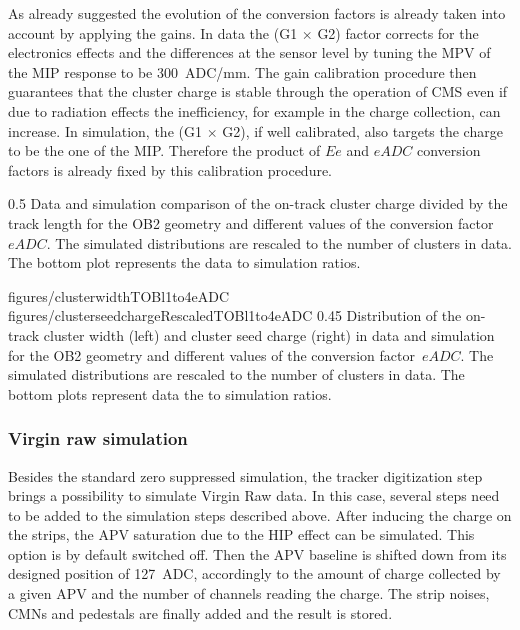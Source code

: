 As already suggested the evolution of the conversion factors is already taken into account by applying the gains. In data the (G1 $\times$ G2) factor corrects for the electronics effects and the differences at the sensor level by tuning the MPV of the MIP response to be 300~ADC/mm. The gain calibration procedure then guarantees that the cluster charge is stable through the operation of CMS even if due to radiation effects the inefficiency, for example in the charge collection, can increase. In simulation, the (G1 $\times$ G2), if well calibrated, also targets the charge to be the one of the MIP. Therefore the product of $Ee$ and $eADC$ conversion factors is already fixed by this calibration procedure. 


                 {0.5}       %
                 { Data and simulation comparison of the on-track cluster charge divided by the track length for the OB2 geometry and different values of the conversion factor~$eADC$. The simulated distributions are rescaled to the number of clusters in data.  The bottom plot represents the data to simulation ratios. }

                 {figures/clusterwidthTOBl1to4eADC}
                 {figures/clusterseedchargeRescaledTOBl1to4eADC} %
                 {0.45}       %
                 { Distribution of the on-track cluster width (left) and cluster seed charge (right) in data and simulation for the OB2 geometry and different values of the conversion factor~$eADC$.  The simulated distributions are rescaled to the number of clusters in data.  The bottom plots represent data the to simulation ratios. }

 
\subsubsection{Virgin raw simulation~\label{sec:VRsimu}}

Besides the standard zero suppressed simulation, the tracker digitization step brings a possibility to simulate Virgin Raw data. In this case, several steps need to be added to the simulation steps described above. After inducing the charge on the strips, the APV saturation due to the HIP effect can be simulated. This option is by default switched off. Then the APV baseline is shifted down from its designed position of 127~ADC, accordingly to the amount of charge collected by a given APV and the number of channels reading the charge. The strip noises, CMNs and pedestals are finally added and the result is stored.

